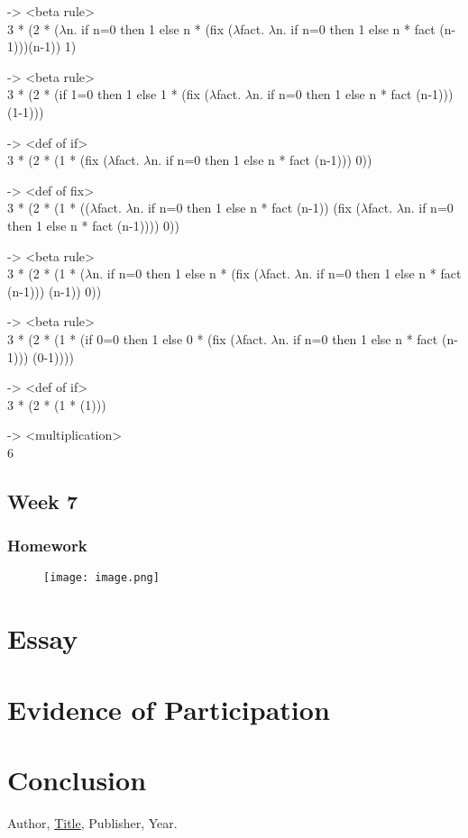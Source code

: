 \documentclass{article}
\theoremstyle{theorem}
\theoremstyle{definition}
\theoremstyle{remark}
\begin{document}
-> <beta rule>\\
3 * (2 * ($\lambda$n. if n=0 then 1 else n * (fix ($\lambda$fact. $\lambda$n. if n=0 then 1 else n * fact (n-1)))(n-1)) 1)

-> <beta rule>\\
3 * (2 * (if 1=0 then 1 else 1 * (fix ($\lambda$fact. $\lambda$n. if n=0 then 1 else n * fact (n-1)))(1-1)))

-> <def of if>\\
3 * (2 * (1 * (fix ($\lambda$fact. $\lambda$n. if n=0 then 1 else n * fact (n-1))) 0))

-> <def of fix>\\
3 * (2 * (1 * (($\lambda$fact. $\lambda$n. if n=0 then 1 else n * fact (n-1)) (fix ($\lambda$fact. $\lambda$n. if n=0 then 1 else n * fact (n-1)))) 0))

-> <beta rule>\\
3 * (2 * (1 * ($\lambda$n. if n=0 then 1 else n * (fix ($\lambda$fact. $\lambda$n. if n=0 then 1 else n * fact (n-1))) (n-1)) 0))

-> <beta rule>\\
3 * (2 * (1 * (if 0=0 then 1 else 0 * (fix ($\lambda$fact. $\lambda$n. if n=0 then 1 else n * fact (n-1))) (0-1))))

-> <def of if>\\
3 * (2 * (1 * (1)))

-> <multiplication>\\
6

\subsection{Week 7}

\subsubsection{Homework}

\begin{figure}[H]
    \centering
    \texttt{[image: image.png]}
\end{figure}

\section{Essay}

\section{Evidence of Participation}

\section{Conclusion}\label{conclusion}

\begin{thebibliography}{99}
 Author, \href{https://en.wikipedia.org/wiki/LaTeX}{Title}, Publisher, Year.
\end{thebibliography}
\end{document}
